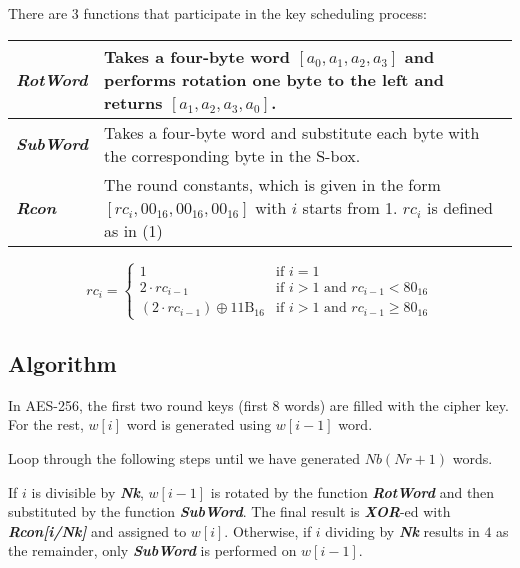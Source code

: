 \documentclass[a4paper, 10pt]{article}
\begin{document}
\begin{multicols}{2}
                There are 3 functions that participate in the key scheduling process:

                    \setlength{\tabcolsep}{5pt} %
                    \renewcommand{\arraystretch}{1.5} %
                    \noindent
                        \begin{tabular}{m{2cm} m{6cm}}
                            \textbf{\textit{RotWord}} & Takes a four-byte word $[a_{0},a_{1},a_{2},a_{3}]$ and performs rotation one byte to the left and returns $[a_{1},a_{2},a_{3},a_{0}]$.\\
                            \hline
                            \textbf{\textit{SubWord}} & Takes a four-byte word and substitute each byte with the corresponding byte in the S-box.\\
                            \hline
                            \textbf{\textit{Rcon}} & The round constants, which is given in the form $[rc_{i},00_{16},00_{16},00_{16}]$ with $i$ starts from 1. $rc_{i}$ is defined as in (1)\\
                        \end{tabular}

                        \begin{equation}
                            rc_{i}=
                            \begin{cases}
                                1 & \text{if } i=1\\
                                2 \cdot  rc_{i-1} & \text{if } i>1 \text{ and } rc_{i-1}<80_{16}\\
                                \left(2 \cdot  rc_{i-1}\right)\oplus 11\text{B}_{16} & \text{if } i>1 \text{ and } rc_{i-1} \ge 80_{16}
                            \end{cases}
                        \end{equation}

            \subsection{Algorithm}
                In AES-256, the first two round keys (first 8 words) are filled with the cipher key. For the rest, $w[i]$ word is generated using $w[i-1]$ word.

                Loop through the following steps until we have generated $Nb(Nr+1)$ words.

                If $i$ is divisible by \textbf{\textit{Nk}}, $w[i-1]$ is rotated by the function \textbf{\textit{RotWord}} and then substituted by the function \textbf{\textit{SubWord}}. The final result is \textbf{\textit{XOR}}-ed with \textbf{\textit{Rcon[i/Nk]}} and assigned to $w[i]$. Otherwise, if $i$ dividing by \textbf{\textit{Nk}} results in $4$ as the remainder, only \textbf{\textit{SubWord}} is performed on $w[i-1]$.


\end{multicols}
\end{document}
